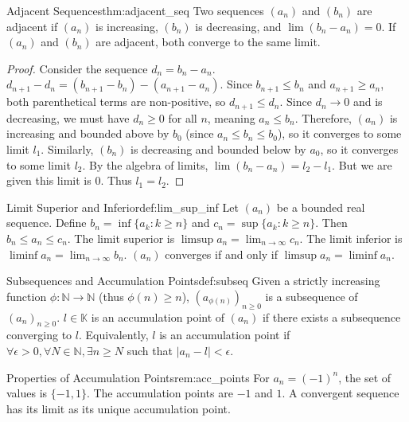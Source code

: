 \documentclass[11pt, a4paper]{article}
\begin{document}
\begin{theorem}{Adjacent Sequences}{thm:adjacent_seq}
Two sequences $(a_n)$ and $(b_n)$ are adjacent if $(a_n)$ is increasing, $(b_n)$ is decreasing, and $\lim (b_n - a_n) = 0$. If $(a_n)$ and $(b_n)$ are adjacent, both converge to the same limit.
\end{theorem}
\begin{proof}
Consider the sequence $d_n = b_n - a_n$. $d_{n+1} - d_n = (b_{n+1} - b_n) - (a_{n+1} - a_n)$.
Since $b_{n+1} \le b_n$ and $a_{n+1} \ge a_n$, both parenthetical terms are non-positive, so $d_{n+1} \le d_n$.
Since $d_n \to 0$ and is decreasing, we must have $d_n \ge 0$ for all $n$, meaning $a_n \le b_n$.
Therefore, $(a_n)$ is increasing and bounded above by $b_0$ (since $a_n \le b_n \le b_0$), so it converges to some limit $l_1$.
Similarly, $(b_n)$ is decreasing and bounded below by $a_0$, so it converges to some limit $l_2$.
By the algebra of limits, $\lim (b_n - a_n) = l_2 - l_1$. But we are given this limit is $0$. Thus $l_1 = l_2$.
\end{proof}

\begin{definition}{Limit Superior and Inferior}{def:lim_sup_inf}
Let $(a_n)$ be a bounded real sequence. Define $b_n = \inf\{a_k : k \ge n\}$ and $c_n = \sup\{a_k : k \ge n\}$. Then $b_n \le a_n \le c_n$.
The limit superior is $\limsup a_n = \lim_{n \to \infty} c_n$. The limit inferior is $\liminf a_n = \lim_{n \to \infty} b_n$.
$(a_n)$ converges if and only if $\limsup a_n = \liminf a_n$.
\end{definition}

\begin{definition}{Subsequences and Accumulation Points}{def:subseq}
Given a strictly increasing function $\phi: \mathbb{N} \to \mathbb{N}$ (thus $\phi(n) \ge n$), $(a_{\phi(n)})_{n \ge 0}$ is a subsequence of $(a_n)_{n \ge 0}$.
$l \in \mathbb{K}$ is an accumulation point of $(a_n)$ if there exists a subsequence converging to $l$. Equivalently, $l$ is an accumulation point if $\forall \epsilon > 0, \forall N \in \mathbb{N}, \exists n \ge N$ such that $|a_n - l| < \epsilon$.
\end{definition}

\begin{remark}{Properties of Accumulation Points}{rem:acc_points}
For $a_n = (-1)^n$, the set of values is $\{-1, 1\}$. The accumulation points are $-1$ and $1$. A convergent sequence has its limit as its unique accumulation point.
\end{remark}
\end{document}
